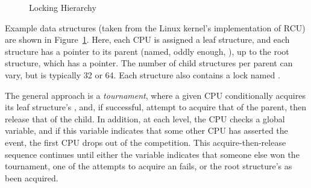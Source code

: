 \begin{figure}[tb]
\centering
{}
\caption{Locking Hierarchy}
\label{fig:lock:Locking Hierarchy}
\end{figure}

Example data structures (taken from the Linux kernel's implementation
of RCU) are shown in
Figure~\ref{fig:lock:Locking Hierarchy}.
Here, each CPU is assigned a leaf  structure, and each
 structure has a pointer to its parent (named, oddly
enough, ), up to the root  structure,
which has a   pointer.
The number of child  structures per parent can vary,
but is typically 32 or 64.
Each  structure also contains a lock named .

The general approach is a \emph{tournament}, where
a given CPU conditionally acquires its
leaf  structure's , and, if successful,
attempt to acquire that of the parent, then release that of the child.
In addition, at each level, the CPU checks a global 
variable, and if this variable indicates that some other CPU has
asserted the event, the first CPU drops out of the competition.
This acquire-then-release sequence continues until either the
 variable indicates that someone else won the tournament,
one of the attempts to acquire an  fails, or
the root  structure's  as been acquired.

